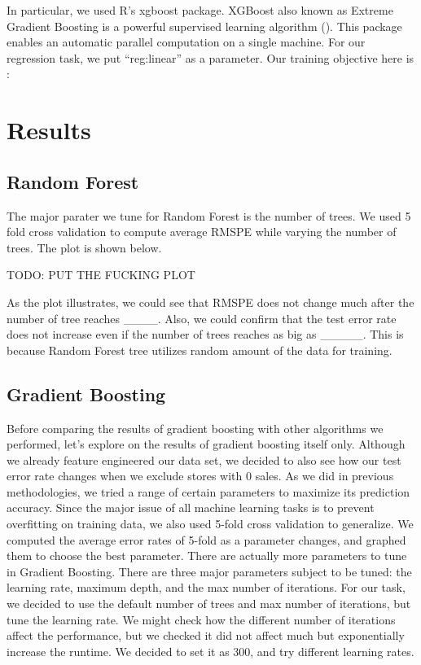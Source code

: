 \documentclass[letterpaper,twocolumn,10pt]{article}
\begin{document}
In particular, we used R's xgboost package. XGBoost also known as Extreme Gradient Boosting is a powerful supervised learning algorithm (). This package enables an automatic parallel computation on a single machine. For our regression task, we put ``reg:linear'' as a parameter. Our training objective here is :




\section{Results}



\subsection{Random Forest}
The major parater we tune for Random Forest is the number of trees. We used 5 fold cross validation to compute average RMSPE while varying the number of trees. The plot is shown below. 

TODO: PUT THE FUCKING PLOT

As the plot illustrates, we could see that RMSPE does not change much after the number of tree reaches ____. Also, we could confirm that the test error rate does not increase even if the number of trees reaches as big as _____. This is because Random Forest tree utilizes random amount of the data for training. 


\subsection{Gradient Boosting}
Before comparing the results of gradient boosting with other algorithms we performed, let's explore on the results of gradient boosting itself only. Although we already feature engineered our data set, we decided to also see how our test error rate changes when we exclude stores with 0 sales. As we did in previous methodologies, we tried a range of certain parameters to maximize its prediction accuracy. Since the major issue of all machine learning tasks is to prevent overfitting on training data, we also used 5-fold cross validation to generalize. We computed the average error rates of 5-fold as a parameter changes, and graphed them to choose the best parameter. There are actually more parameters to tune in Gradient Boosting. There are three major parameters subject to be tuned: the learning rate, maximum depth, and the max number of iterations. For our task, we decided to use the default number of trees and max number of iterations, but tune the learning rate. We might check how the different number of iterations affect the performance, but we checked it did not affect much but exponentially increase the runtime. We decided to set it as 300, and try different learning rates. 
\end{document}
